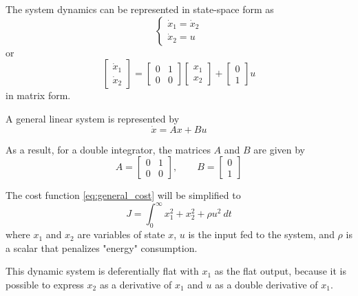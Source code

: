 \par The system dynamics can be represented in state-space form as 
\begin{equation}
    \label{eq:dynamics_double_int}
    \begin{cases}
        \dot{x}_1 = \dot{x}_2 \\
        \dot{x}_2 = u
    \end{cases}
\end{equation}
or
\begin{equation}
    \begin{bmatrix}
    \dot{x}_1 \\ \dot{x}_2
    \end{bmatrix} = 
    \begin{bmatrix} 0 & 1 \\ 0 & 0 \end{bmatrix} 
    \begin{bmatrix} x_1 \\ x_2 \end{bmatrix} + 
    \begin{bmatrix} 0 \\ 1 \end{bmatrix} u
    \label{eq:state_space_double_int}
\end{equation}
in matrix form. 

\par A general linear system is represented by
\begin{equation}
    \dot{x} = Ax + Bu
    \label{eq:general_state_space}
\end{equation}

\par As a result, for a double integrator, the matrices $A$ and $B$ are given by
\begin{equation}
    A = \begin{bmatrix} 0 & 1 \\ 0 & 0 \end{bmatrix}, \qquad B = \begin{bmatrix} 0 \\ 1 \end{bmatrix}
    \label{eq:A_and_B}
\end{equation}

\par The cost function \ref{eq:general_cost} will be simplified to
\begin{equation}
    J = \int_0^\infty x_1^2 + x_2^2 + \rho u^2\  dt
    \label{eq:my_cost}
\end{equation}
where $x_1$ and $x_2$ are variables of state $x$, $u$ is the input fed to the system, and $\rho$ is a scalar that penalizes "energy" consumption.
\par This dynamic system is deferentially flat with $x_1$ as the flat output, because it is possible to express $x_2$ as a derivative of $x_1$ and $u$ as a double derivative of $x_1$.

